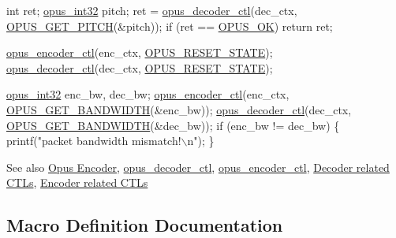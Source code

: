 \begin{DoxyCode}
\textcolor{keywordtype}{int} ret;
\hyperlink{opus__types_8h_aa4d309d6f80b99dbabebc8f98879ab9a}{opus\_int32} pitch;
ret = \hyperlink{group__opus__decoder_ga2d492844b4f66e7f34d85870f13d4846}{opus\_decoder\_ctl}(dec\_ctx, \hyperlink{group__opus__decoderctls_gaa89fc25eb35fc31a02b508562dd83820}{OPUS\_GET\_PITCH}(&pitch));
\textcolor{keywordflow}{if} (ret == \hyperlink{group__opus__errorcodes_gaa44cf8a185e1b5cb940ef63eb4f02d21}{OPUS\_OK}) \textcolor{keywordflow}{return} ret;

\hyperlink{group__opus__encoder_ga164cbb0425238961919adf1db67949df}{opus\_encoder\_ctl}(enc\_ctx, \hyperlink{group__opus__genericctls_gadc74e4fa8bcdf9994187d52d92207337}{OPUS\_RESET\_STATE});
\hyperlink{group__opus__decoder_ga2d492844b4f66e7f34d85870f13d4846}{opus\_decoder\_ctl}(dec\_ctx, \hyperlink{group__opus__genericctls_gadc74e4fa8bcdf9994187d52d92207337}{OPUS\_RESET\_STATE});

\hyperlink{opus__types_8h_aa4d309d6f80b99dbabebc8f98879ab9a}{opus\_int32} enc\_bw, dec\_bw;
\hyperlink{group__opus__encoder_ga164cbb0425238961919adf1db67949df}{opus\_encoder\_ctl}(enc\_ctx, \hyperlink{group__opus__genericctls_ga29db1d9b5e670debec54d1163ad2ec62}{OPUS\_GET\_BANDWIDTH}(&enc\_bw));
\hyperlink{group__opus__decoder_ga2d492844b4f66e7f34d85870f13d4846}{opus\_decoder\_ctl}(dec\_ctx, \hyperlink{group__opus__genericctls_ga29db1d9b5e670debec54d1163ad2ec62}{OPUS\_GET\_BANDWIDTH}(&dec\_bw));
\textcolor{keywordflow}{if} (enc\_bw != dec\_bw) \{
  printf(\textcolor{stringliteral}{"packet bandwidth mismatch!\(\backslash\)n"});
\}
\end{DoxyCode}


\begin{DoxySeeAlso}{See also}
\hyperlink{group__opus__encoder}{Opus Encoder}, \hyperlink{group__opus__decoder_ga2d492844b4f66e7f34d85870f13d4846}{opus\+\_\+decoder\+\_\+ctl}, \hyperlink{group__opus__encoder_ga164cbb0425238961919adf1db67949df}{opus\+\_\+encoder\+\_\+ctl}, \hyperlink{group__opus__decoderctls}{Decoder related C\+T\+Ls}, \hyperlink{group__opus__encoderctls}{Encoder related C\+T\+Ls} 
\end{DoxySeeAlso}


\subsection{Macro Definition Documentation}
